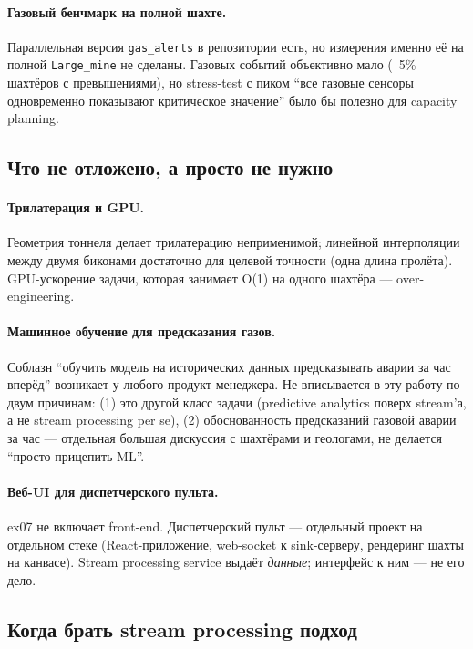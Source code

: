 \paragraph{Газовый бенчмарк на полной шахте.} Параллельная версия
\texttt{gas\_alerts} в репозитории есть, но измерения именно её на
полной \texttt{Large\_mine} не сделаны. Газовых событий
объективно мало (~5\% шахтёров с превышениями), но stress-test
с пиком ``все газовые сенсоры одновременно показывают критическое
значение'' было бы полезно для capacity planning.

\subsection{Что не отложено, а просто не нужно}

\paragraph{Трилатерация и GPU.} Геометрия тоннеля делает
трилатерацию неприменимой; линейной интерполяции между двумя
биконами достаточно для целевой точности (одна длина пролёта).
GPU-ускорение задачи, которая занимает O(1) на одного шахтёра ---
over-engineering.

\paragraph{Машинное обучение для предсказания газов.} Соблазн
``обучить модель на исторических данных предсказывать аварии за час
вперёд'' возникает у любого продукт-менеджера. Не вписывается в эту
работу по двум причинам: (1) это другой класс задачи (predictive
analytics поверх stream'а, а не stream processing per se),
(2) обоснованность предсказаний газовой аварии за час --- отдельная
большая дискуссия с шахтёрами и геологами, не делается ``просто
прицепить ML''.

\paragraph{Веб-UI для диспетчерского пульта.} ex07 не включает
front-end. Диспетчерский пульт --- отдельный проект на отдельном
стеке (React-приложение, web-socket к sink-серверу, рендеринг
шахты на канвасе). Stream processing service выдаёт \emph{данные};
интерфейс к ним --- не его дело.

\subsection{Когда брать stream processing подход}

